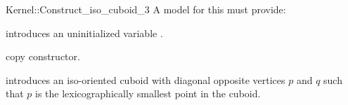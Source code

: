 \begin{ccRefFunctionObjectConcept}{Kernel::Construct_iso_cuboid_3}
A model for this must provide:



\ccHidden {}
             {introduces an uninitialized variable .}

\ccHidden {}
 	    {copy constructor.}

            {introduces an iso-oriented cuboid  with diagonal
             opposite vertices $p$ and $q$ such that $p$ is the
             lexicographically smallest point in the cuboid.}

\end{ccRefFunctionObjectConcept}
